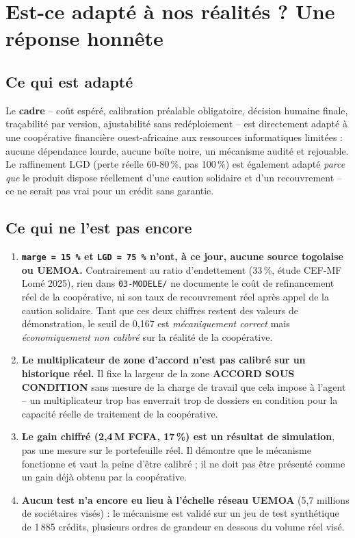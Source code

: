 \documentclass[11pt,a4paper]{article}
\newcommand{\tranche}[2]{\textcolor{#1}{\textbf{#2}}}
\begin{document}
\section{Est-ce adapté à nos réalités ? Une réponse honnête}

\subsection{Ce qui est adapté}

Le \textbf{cadre} -- coût espéré, calibration préalable obligatoire, décision humaine finale,
traçabilité par version, ajustabilité sans redéploiement -- est directement adapté à une
coopérative financière ouest-africaine aux ressources informatiques limitées : aucune dépendance
lourde, aucune boîte noire, un mécanisme audité et rejouable. Le raffinement LGD (perte réelle
60-80\,\%, pas 100\,\%) est également adapté \emph{parce que} le produit dispose réellement d'une
caution solidaire et d'un recouvrement -- ce ne serait pas vrai pour un crédit sans garantie.

\subsection{Ce qui ne l'est pas encore}

\begin{enumerate}
\item \textbf{\texttt{marge = 15\,\%} et \texttt{LGD = 75\,\%} n'ont, à ce jour, aucune source
togolaise ou UEMOA.} Contrairement au ratio d'endettement (33\,\%, étude CEF-MF Lomé 2025), rien
dans \texttt{03-MODELE/} ne documente le coût de refinancement réel de la coopérative, ni son taux
de recouvrement réel après appel de la caution solidaire. Tant que ces deux chiffres restent des
valeurs de démonstration, le seuil de 0,167 est \emph{mécaniquement correct} mais
\emph{économiquement non calibré} sur la réalité de la coopérative.
\item \textbf{Le multiplicateur de zone d'accord n'est pas calibré sur un historique réel.} Il
fixe la largeur de la zone \tranche{orangevigilance}{ACCORD SOUS CONDITION} sans mesure de la
charge de travail que cela impose à l'agent -- un multiplicateur trop bas enverrait trop de
dossiers en condition pour la capacité réelle de traitement de la coopérative.
\item \textbf{Le gain chiffré (2,4\,M FCFA, 17\,\%) est un résultat de simulation}, pas une mesure
sur le portefeuille réel. Il démontre que le mécanisme fonctionne et vaut la peine d'être calibré ;
il ne doit pas être présenté comme un gain déjà obtenu par la coopérative.
\item \textbf{Aucun test n'a encore eu lieu à l'échelle réseau UEMOA} (5,7 millions de sociétaires
visés) : le mécanisme est validé sur un jeu de test synthétique de 1\,885 crédits, plusieurs ordres
de grandeur en dessous du volume réel visé.
\end{enumerate}
\end{document}
